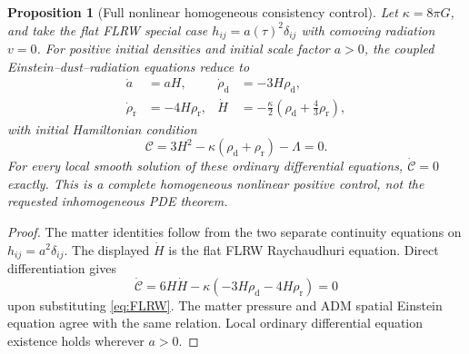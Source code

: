 \documentclass[11pt,a4paper]{article}
\newtheorem{proposition}{Proposition}
\begin{document}
\begin{proposition}[Full nonlinear homogeneous consistency control]
\label{prop:FLRW}
Let $\kappa=8\pi G$, and take the flat
FLRW special case
$h_{ij}=a(\tau)^2\delta_{ij}$ with
comoving radiation $v=0$.
For positive initial densities and
initial scale factor $a>0$,
the coupled Einstein--dust--radiation
equations reduce to
\begin{equation}\label{eq:FLRW}
\begin{aligned}
\dot a&=aH,&
\dot\rho_{\mathrm d}&=-3H\rho_{\mathrm d},\\
\dot\rho_{\mathrm r}&=-4H\rho_{\mathrm r},&
\dot H&=-\frac{\kappa}{2}
\left(\rho_{\mathrm d}
+\frac43\rho_{\mathrm r}\right),
\end{aligned}
\end{equation}
with initial Hamiltonian condition
\begin{equation}\label{eq:FLRW-C}
\mathcal C=
3H^2-\kappa(\rho_{\mathrm d}
+\rho_{\mathrm r})-\Lambda=0.
\end{equation}
For every local smooth solution of
these ordinary differential equations,
$\dot{\mathcal C}=0$ exactly.
This is a complete \emph{homogeneous
nonlinear positive control}, not the
requested inhomogeneous PDE theorem.
\end{proposition}
\begin{proof}
The matter identities follow from
the two separate continuity equations
on $h_{ij}=a^2\delta_{ij}$.
The displayed $\dot H$ is the
flat FLRW Raychaudhuri equation.
Direct differentiation gives
\[
\dot{\mathcal C}
=6H\dot H-\kappa
(-3H\rho_{\mathrm d}
-4H\rho_{\mathrm r})=0
\]
upon substituting \eqref{eq:FLRW}.
The matter pressure and ADM spatial
Einstein equation agree with the
same relation. Local ordinary
differential equation existence
holds wherever $a>0$.
\end{proof}
\end{document}
